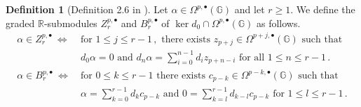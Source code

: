 \documentclass[dvipsnames]{amsart}
\theoremstyle{definition}
\newtheorem{definition}[theorem]{Definition}
\theoremstyle{definition}
\numberwithin{equation}{section}
\newcommand{\R}{\mathbb{R}}
\newcommand{\G}{\mathbb{G}}
\begin{document}
\begin{definition}[Definition 2.6 in \cite{livernet2020spectral}]\label{Z and B defined} Let $\alpha\in\Omega^{p,\bullet}(\G)$ and let $r\ge 1$. We define the graded $\R$-submodules $Z_r^{p,\bullet}$ and $B_r^{p,\bullet}$ of $\ker d_0\cap\Omega^{p,\bullet}(\G)$ as follows.
\begin{align*}
    \alpha\in Z_r^{p,\bullet}\ \Longleftrightarrow&\ \text{for }1\le j\le r-1\,,\text{ there exists }z_{p+j}\in\Omega^{p+j,\bullet}(\G)\text{ such that}\\&\ d_0\alpha=0\text{ and }d_n\alpha=\sum_{i=0}^{n-1}d_iz_{p+n-i}\text{ for all }1\le n\le r-1\,.\\
    \alpha\in B_r^{p,\bullet}\ \Longleftrightarrow&\ \text{for }0\le k\le r-1\text{ there exists }c_{p-k}\in\Omega^{p-k,\bullet}(\G)\text{ such that}\\&\ \alpha=\sum_{k=0}^{r-1}d_kc_{p-k}\text{ and }0=\sum_{k=l}^{r-1}d_{k-l}c_{p-k}\text{ for }1\le l\le r-1\,.
\end{align*}
\end{definition}
\end{document}
